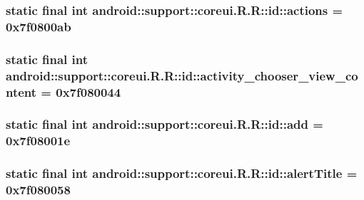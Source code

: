 \hypertarget{classandroid_1_1support_1_1coreui_1_1_r_1_1id_2cc4c8dda65dfa024159bcc7f7007a9d}{
\subsubsection[{actions}]{\setlength{\rightskip}{0pt plus 5cm}static final int android::support::coreui.R.R::id::actions = 0x7f0800ab}}
\label{classandroid_1_1support_1_1coreui_1_1_r_1_1id_2cc4c8dda65dfa024159bcc7f7007a9d}


\hypertarget{classandroid_1_1support_1_1coreui_1_1_r_1_1id_c2e7bac0b53002da80749d8eca5d4e94}{
\subsubsection[{activity\_\-chooser\_\-view\_\-content}]{\setlength{\rightskip}{0pt plus 5cm}static final int android::support::coreui.R.R::id::activity\_\-chooser\_\-view\_\-content = 0x7f080044}}
\label{classandroid_1_1support_1_1coreui_1_1_r_1_1id_c2e7bac0b53002da80749d8eca5d4e94}


\hypertarget{classandroid_1_1support_1_1coreui_1_1_r_1_1id_0d23c8016d9b162ccc5d7f9af891c835}{
\subsubsection[{add}]{\setlength{\rightskip}{0pt plus 5cm}static final int android::support::coreui.R.R::id::add = 0x7f08001e}}
\label{classandroid_1_1support_1_1coreui_1_1_r_1_1id_0d23c8016d9b162ccc5d7f9af891c835}


\hypertarget{classandroid_1_1support_1_1coreui_1_1_r_1_1id_6cfaa6f52456f20af3debfbfa87779ed}{
\subsubsection[{alertTitle}]{\setlength{\rightskip}{0pt plus 5cm}static final int android::support::coreui.R.R::id::alertTitle = 0x7f080058}}
\label{classandroid_1_1support_1_1coreui_1_1_r_1_1id_6cfaa6f52456f20af3debfbfa87779ed}


